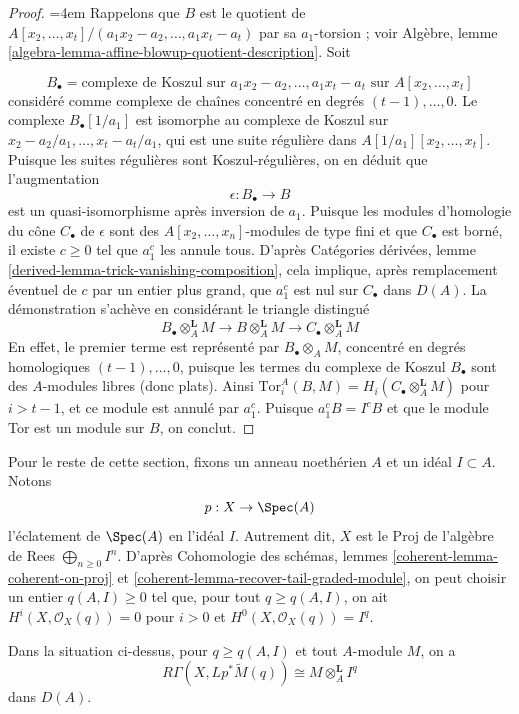 \begin{proof}
{\emergencystretch=4em
Rappelons que $B$ est le quotient de $A[x_2, \ldots, x_t]/(a_1x_2 - a_2, \ldots, a_1x_t - a_t)$ par sa $a_1$-torsion ; voir Algèbre, lemme \ref{algebra-lemma-affine-blowup-quotient-description}. Soit
\par}
$$
B_\bullet = \text{complexe de Koszul sur }a_1x_2 - a_2, \ldots, a_1x_t - a_t
\text{ sur }A[x_2, \ldots, x_t]
$$
considéré comme complexe de chaînes concentré en degrés $(t - 1), \ldots, 0$. Le complexe $B_\bullet[1/a_1]$ est isomorphe au complexe de Koszul sur $x_2 - a_2/a_1, \ldots, x_t - a_t/a_1$, qui est une suite régulière dans $A[1/a_1][x_2, \ldots, x_t]$. Puisque les suites régulières sont Koszul-régulières, on en déduit que l'augmentation
$$
\epsilon : B_\bullet \longrightarrow B
$$
est un quasi-isomorphisme après inversion de $a_1$. Puisque les modules d'homologie du cône $C_\bullet$ de $\epsilon$ sont des $A[x_2, \ldots, x_n]$-modules de type fini et que $C_\bullet$ est borné, il existe $c \geq 0$ tel que $a_1^c$ les annule tous. D'après Catégories dérivées, lemme \ref{derived-lemma-trick-vanishing-composition}, cela implique, après remplacement éventuel de $c$ par un entier plus grand, que $a_1^c$ est nul sur $C_\bullet$ dans $D(A)$. La démonstration s'achève en considérant le triangle distingué
$$
B_\bullet \otimes_A^\mathbf{L} M \to
B \otimes_A^\mathbf{L} M \to
C_\bullet \otimes_A^\mathbf{L} M
$$
En effet, le premier terme est représenté par $B_\bullet \otimes_A M$, concentré en degrés homologiques $(t - 1), \ldots, 0$, puisque les termes du complexe de Koszul $B_\bullet$ sont des $A$-modules libres (donc plats). Ainsi $\text{Tor}_i^A(B, M) = H_i(C_\bullet \otimes_A^\mathbf{L} M)$ pour $i > t - 1$, et ce module est annulé par $a_1^c$. Puisque $a_1^cB = I^cB$ et que le module Tor est un module sur $B$, on conclut.
\end{proof}

\noindent
Pour le reste de cette section, fixons un anneau noethérien $A$ et un idéal $I \subset A$. Notons
$$
p : X \to \Spec(A)
$$
l'éclatement de $\Spec(A)$ en l'idéal $I$. Autrement dit, $X$ est le $\text{Proj}$ de l'algèbre de Rees $\bigoplus_{n \geq 0} I^n$. D'après Cohomologie des schémas, lemmes \ref{coherent-lemma-coherent-on-proj} et \ref{coherent-lemma-recover-tail-graded-module}, on peut choisir un entier $q(A, I) \geq 0$ tel que, pour tout $q \geq q(A, I)$, on ait $H^i(X, \mathcal{O}_X(q)) = 0$ pour $i > 0$ et $H^0(X, \mathcal{O}_X(q)) = I^q$.

\begin{lemma}
\label{lemma-compute-tor-Iq}
Dans la situation ci-dessus, pour $q \geq q(A, I)$ et tout $A$-module $M$, on a
$$
R\Gamma(X, Lp^*\widetilde{M}(q)) \cong M \otimes_A^\mathbf{L} I^q
$$
dans $D(A)$.
\end{lemma}

